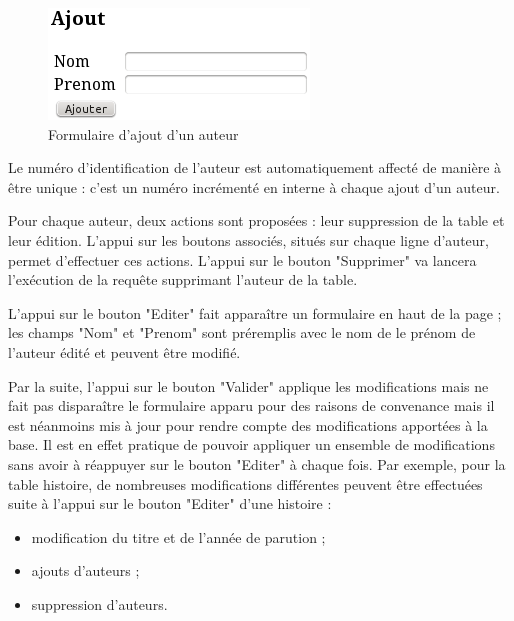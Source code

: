 \documentclass[12pt]{article}
\begin{document}
\begin{figure}[h!]
\begin{center}
\noindent\includegraphics[]{formulaire-ajout-auteur}
  \caption{Formulaire d'ajout d'un auteur}
\end{center}
\end{figure}

Le numéro d'identification de l'auteur est automatiquement affecté de manière
à être unique : c'est un numéro incrémenté en interne à chaque ajout d'un
auteur.

Pour chaque auteur, deux actions sont proposées : leur suppression de la table
et leur édition. L'appui sur les boutons associés, situés sur chaque ligne
d'auteur, permet d'effectuer ces actions. L'appui sur le bouton "Supprimer" va
lancera l'exécution de la requête supprimant l'auteur de la table.

L'appui sur le bouton "Editer" fait apparaître un formulaire en haut de la
page ; les champs "Nom" et "Prenom" sont préremplis avec le nom de le prénom
de l'auteur édité et peuvent être modifié.

Par la suite, l'appui sur le bouton "Valider" applique les modifications mais
ne fait pas disparaître le formulaire apparu pour des raisons de convenance
mais il est néanmoins mis à jour pour rendre compte des modifications
apportées à la base.
Il est en effet pratique de pouvoir appliquer un ensemble de modifications
sans avoir à réappuyer sur le bouton "Editer" à chaque fois.
Par exemple, pour la table histoire, de nombreuses modifications différentes
peuvent être effectuées suite à l'appui sur le bouton "Editer" d'une histoire
: 
\begin{itemize}
	\item modification du titre et de l'année de parution ;
	\item ajouts d'auteurs ;
	\item suppression d'auteurs.
\end{itemize}
\end{document}

